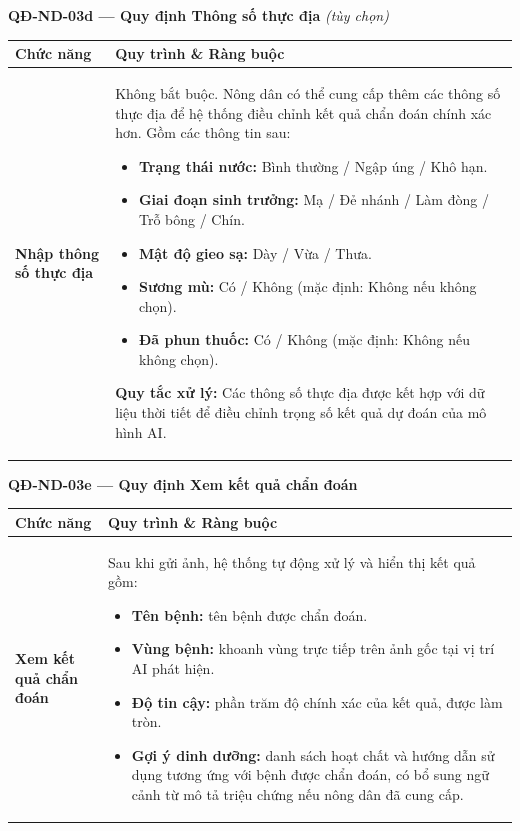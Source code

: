 \documentclass[12pt,a4paper]{article}
\begin{document}
\vspace{0.3cm}
\noindent\textbf{QĐ-ND-03d --- Quy định Thông số thực địa} \textit{(tùy chọn)}
 
\begin{longtable}{|
    >{\raggedright\arraybackslash}p{2.8cm}|
    >{\raggedright\arraybackslash}p{12cm}|}
\hline
\rowcolor{headerblue}
\textbf{Chức năng} & \textbf{Quy trình \& Ràng buộc} \\
\hline
\endhead
\textbf{Nhập thông số thực địa} &
Không bắt buộc. Nông dân có thể cung cấp thêm các thông số thực địa để hệ thống điều chỉnh kết quả chẩn đoán chính xác hơn. Gồm các thông tin sau:
\begin{itemize}[leftmargin=*,topsep=2pt,itemsep=1pt]
    \item \textbf{Trạng thái nước:} Bình thường / Ngập úng / Khô hạn.
    \item \textbf{Giai đoạn sinh trưởng:} Mạ / Đẻ nhánh / Làm đòng / Trỗ bông / Chín.
    \item \textbf{Mật độ gieo sạ:} Dày / Vừa / Thưa.
    \item \textbf{Sương mù:} Có / Không (mặc định: Không nếu không chọn).
    \item \textbf{Đã phun thuốc:} Có / Không (mặc định: Không nếu không chọn).
\end{itemize}
\textbf{Quy tắc xử lý:} Các thông số thực địa được kết hợp với dữ liệu thời tiết để điều chỉnh trọng số kết quả dự đoán của mô hình AI. \\
\hline
\end{longtable}
 
\vspace{0.3cm}
\noindent\textbf{QĐ-ND-03e --- Quy định Xem kết quả chẩn đoán}
 
\begin{longtable}{|
    >{\raggedright\arraybackslash}p{2.8cm}|
    >{\raggedright\arraybackslash}p{12cm}|}
\hline
\rowcolor{headerblue}
\textbf{Chức năng} & \textbf{Quy trình \& Ràng buộc} \\
\hline
\endhead
\textbf{Xem kết quả chẩn đoán} &
Sau khi gửi ảnh, hệ thống tự động xử lý và hiển thị kết quả gồm:
\begin{itemize}[leftmargin=*,topsep=2pt,itemsep=1pt]
    \item \textbf{Tên bệnh:} tên bệnh được chẩn đoán.
    \item \textbf{Vùng bệnh:} khoanh vùng trực tiếp trên ảnh gốc tại vị trí AI phát hiện.
    \item \textbf{Độ tin cậy:} phần trăm độ chính xác của kết quả, được làm tròn.
    \item \textbf{Gợi ý dinh dưỡng:} danh sách hoạt chất và hướng dẫn sử dụng tương ứng với bệnh được chẩn đoán, có bổ sung ngữ cảnh từ mô tả triệu chứng nếu nông dân đã cung cấp.
\end{itemize} \\
\hline
\end{longtable}
 
\end{document}
